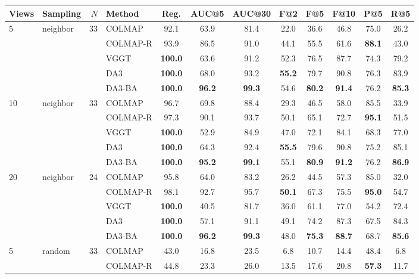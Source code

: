 \begin{tabular}{llr lcccccccc}
\toprule
Views & Sampling & $N$ & Method & Reg. & AUC@5 & AUC@30 & F@2 & F@5 & F@10 & P@5 & R@5 \\
\midrule
\multirow{5}{*}{5} & \multirow{5}{*}{neighbor} & \multirow{5}{*}{33} & COLMAP & 92.1 & 63.9 & 81.4 & 22.0 & 36.6 & 46.8 & 75.0 & 26.2 \\
 & &  & COLMAP-R & 93.9 & 86.5 & 91.0 & 44.1 & 55.5 & 61.6 & \textbf{88.1} & 43.0 \\
 & &  & VGGT & \textbf{100.0} & 63.6 & 91.2 & 52.3 & 76.5 & 87.7 & 74.3 & 79.2 \\
 & &  & DA3 & \textbf{100.0} & 68.0 & 93.2 & \textbf{55.2} & 79.7 & 90.8 & 76.3 & 83.9 \\
 & &  & DA3-BA & \textbf{100.0} & \textbf{96.2} & \textbf{99.3} & 54.6 & \textbf{80.2} & \textbf{91.4} & 76.2 & \textbf{85.3} \\
\midrule
\multirow{5}{*}{10} & \multirow{5}{*}{neighbor} & \multirow{5}{*}{33} & COLMAP & 96.7 & 69.8 & 88.4 & 29.3 & 46.5 & 58.0 & 85.5 & 33.9 \\
 & &  & COLMAP-R & 97.3 & 90.1 & 93.7 & 50.1 & 65.1 & 72.7 & \textbf{95.1} & 51.5 \\
 & &  & VGGT & \textbf{100.0} & 52.9 & 84.9 & 47.0 & 72.1 & 84.1 & 68.3 & 77.0 \\
 & &  & DA3 & \textbf{100.0} & 64.3 & 92.4 & \textbf{55.5} & 79.6 & 90.8 & 75.2 & 85.1 \\
 & &  & DA3-BA & \textbf{100.0} & \textbf{95.2} & \textbf{99.1} & 55.1 & \textbf{80.9} & \textbf{91.2} & 76.2 & \textbf{86.9} \\
\midrule
\multirow{5}{*}{20} & \multirow{5}{*}{neighbor} & \multirow{5}{*}{24} & COLMAP & 95.8 & 64.0 & 83.2 & 26.2 & 44.5 & 57.3 & 85.0 & 32.0 \\
 & &  & COLMAP-R & 98.1 & 92.7 & 95.7 & \textbf{50.1} & 67.3 & 75.5 & \textbf{95.0} & 54.7 \\
 & &  & VGGT & \textbf{100.0} & 40.5 & 81.7 & 36.0 & 61.1 & 77.0 & 54.2 & 72.4 \\
 & &  & DA3 & \textbf{100.0} & 57.1 & 91.1 & 49.1 & 74.2 & 87.3 & 67.5 & 84.3 \\
 & &  & DA3-BA & \textbf{100.0} & \textbf{96.2} & \textbf{99.3} & 48.0 & \textbf{75.3} & \textbf{88.7} & 68.7 & \textbf{85.6} \\
\midrule
\multirow{5}{*}{5} & \multirow{5}{*}{random} & \multirow{5}{*}{33} & COLMAP & 43.0 & 16.8 & 23.5 & 6.8 & 10.7 & 14.4 & 48.4 & 6.8 \\
 & &  & COLMAP-R & 44.8 & 23.3 & 26.0 & 13.5 & 17.6 & 20.8 & \textbf{57.3} & 11.7 \\

\end{tabular}
